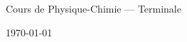 \documentclass[complet]{coursprof} %
\begin{document}
\begin{center}
  {\Huge Cours de Physique-Chimie — Terminale \par}
  \vspace{1cm}
  \today
\end{center}
\newpage

\tableofcontents
\newpage
% 
% 
% 
% 
% 
% 
% 
% 
% 
% 
% 
% 
% 
% 
% 
% 
 
 
% 
% 
% 
%
%
\end{document}
